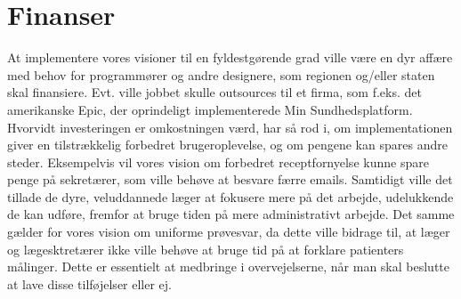 \section{Finanser}
At implementere vores visioner til en fyldestgørende grad ville være en dyr affære med behov for programmører og andre designere, som regionen og/eller staten skal finansiere. Evt. ville jobbet skulle outsources til et firma, som f.eks. det amerikanske Epic, der oprindeligt implementerede Min Sundhedsplatform. Hvorvidt investeringen er omkostningen værd, har så rod i, om implementationen giver en tilstrækkelig forbedret brugeroplevelse, og om pengene kan spares andre steder. Eksempelvis vil vores vision om forbedret receptfornyelse kunne spare penge på sekretærer, som ville behøve at besvare færre emails. Samtidigt ville det tillade de dyre, veluddannede læger at fokusere mere på det arbejde, udelukkende de kan udføre, fremfor at bruge tiden på mere administrativt arbejde. Det samme gælder for vores vision om uniforme prøvesvar, da dette ville bidrage til, at læger og lægesktretærer ikke ville behøve at bruge tid på at forklare patienters målinger. Dette er essentielt at medbringe i overvejelserne, når man skal beslutte at lave disse tilføjelser eller ej. 
